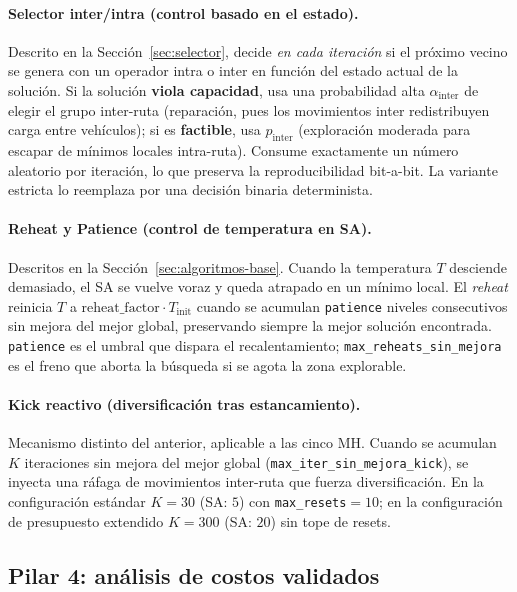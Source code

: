 \documentclass[11pt,a4paper]{article}
\theoremstyle{definition}
\theoremstyle{remark}
\begin{document}
\paragraph{Selector inter/intra (control basado en el estado).}
Descrito en la Sección~\ref{sec:selector}, decide \emph{en cada iteración}
si el próximo vecino se genera con un operador intra o inter en función del
estado actual de la solución. Si la solución \textbf{viola capacidad}, usa
una probabilidad alta $\alpha_{\text{inter}}$ de elegir el grupo inter-ruta
(reparación, pues los movimientos inter redistribuyen carga entre
vehículos); si es \textbf{factible}, usa $p_{\text{inter}}$ (exploración
moderada para escapar de mínimos locales intra-ruta). Consume exactamente
un número aleatorio por iteración, lo que preserva la reproducibilidad
bit-a-bit. La variante estricta lo reemplaza por una decisión binaria
determinista.

\paragraph{Reheat y Patience (control de temperatura en SA).}
Descritos en la Sección~\ref{sec:algoritmos-base}. Cuando la temperatura
$T$ desciende demasiado, el SA se vuelve voraz y queda atrapado en un mínimo
local. El \emph{reheat} reinicia $T$ a $\text{reheat\_factor} \cdot
T_{\text{init}}$ cuando se acumulan \texttt{patience} niveles consecutivos
sin mejora del mejor global, preservando siempre la mejor solución
encontrada. \texttt{patience} es el umbral que dispara el recalentamiento;
\texttt{max\_reheats\_sin\_mejora} es el freno que aborta la búsqueda si se
agota la zona explorable.

\paragraph{Kick reactivo (diversificación tras estancamiento).}
Mecanismo distinto del anterior, aplicable a las cinco MH. Cuando se
acumulan $K$ iteraciones sin mejora del mejor global
(\texttt{max\_iter\_sin\_mejora\_kick}), se inyecta una ráfaga de
movimientos inter-ruta que fuerza diversificación. En la configuración
estándar $K=30$ (SA: $5$) con \texttt{max\_resets}$=10$; en la
configuración de presupuesto extendido $K=300$ (SA: $20$) sin tope de
resets.

\subsection{Pilar 4: análisis de costos validados}
\label{subsec:pilar-costos}
\end{document}

